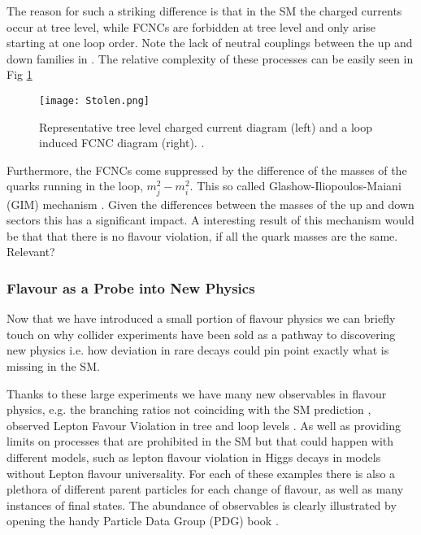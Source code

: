 \setlength{\tabcolsep}{6pt} %
\renewcommand{\arraystretch}{1} %

The reason for such a striking difference is that in the SM the charged currents occur at tree level, while FCNCs are forbidden at tree level and only arise starting at one loop order. Note the lack of neutral couplings between the up and down families in . The relative complexity of these processes can be easily seen in Fig \ref{fig:Flavour_D_1}
%
\begin{figure}[H]
	\centering
	\texttt{[image: Stolen.png]}
	\caption{Representative tree level charged current diagram (left) and a loop induced FCNC diagram (right). .}
	\label{fig:Flavour_D_1}
\end{figure}
%
%
Furthermore, the FCNCs come suppressed by the difference of the masses of the quarks running in the loop, $m^2_j-m^2_i$. This so called Glashow-Iliopoulos-Maiani (GIM) mechanism \cite{glashow1970weak}. Given the differences between the masses of the up and down sectors this has a significant impact. 
%
A interesting result of this mechanism would be that that there is no flavour violation, if all the quark masses are the same. { \color{red} Relevant? } 

\subsubsection{Flavour as a Probe into New Physics}

Now that we have introduced a small portion of flavour physics we can briefly touch on why collider experiments have been sold as a pathway to discovering new physics i.e. how deviation in rare decays could pin point exactly what is missing in the SM. 

Thanks to these large experiments we have many new observables in flavour physics, e.g. the branching ratios not coinciding with the SM prediction \cite{CasteloBranco2014}, observed Lepton Favour Violation in tree and loop levels \cite{Graverini2019}.
%
As well as providing limits on processes that are prohibited in the SM but that could happen with different models, such as lepton flavour violation in Higgs decays \cite{Sirunyan_2018} in models without Lepton flavour universality. 
%
For each of these examples there is also a plethora of different parent particles for each change of flavour, as well as many instances of final states. 
%
The abundance of observables is clearly illustrated by opening the handy Particle Data Group (PDG) book \cite{Tanabashi2018}. 

